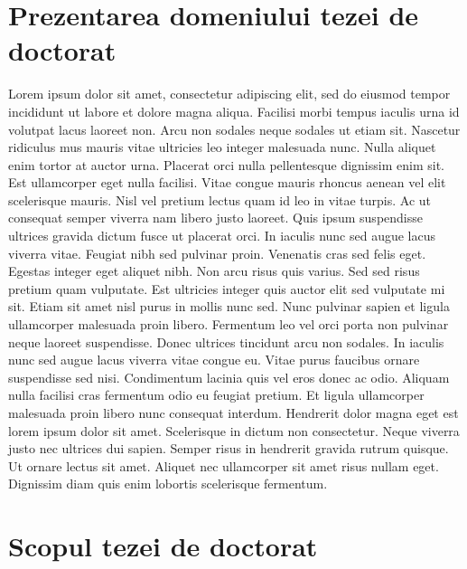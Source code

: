 \section{Prezentarea domeniului tezei de doctorat} %

Lorem ipsum dolor sit amet, consectetur adipiscing elit, sed do eiusmod tempor incididunt ut labore et dolore magna aliqua. Facilisi morbi tempus iaculis urna id volutpat lacus laoreet non. Arcu non sodales neque sodales ut etiam sit. Nascetur ridiculus mus mauris vitae ultricies leo integer malesuada nunc. Nulla aliquet enim tortor at auctor urna. Placerat orci nulla pellentesque dignissim enim sit. Est ullamcorper eget nulla facilisi. Vitae congue mauris rhoncus aenean vel elit scelerisque mauris. Nisl vel pretium lectus quam id leo in vitae turpis. Ac ut consequat semper viverra nam libero justo laoreet. Quis ipsum suspendisse ultrices gravida dictum fusce ut placerat orci. In iaculis nunc sed augue lacus viverra vitae. Feugiat nibh sed pulvinar proin. Venenatis cras sed felis eget. Egestas integer eget aliquet nibh. Non arcu risus quis varius. Sed sed risus pretium quam vulputate.
Est ultricies integer quis auctor elit sed vulputate mi sit. Etiam sit amet nisl purus in mollis nunc sed. Nunc pulvinar sapien et ligula ullamcorper malesuada proin libero. Fermentum leo vel orci porta non pulvinar neque laoreet suspendisse. Donec ultrices tincidunt arcu non sodales. In iaculis nunc sed augue lacus viverra vitae congue eu. Vitae purus faucibus ornare suspendisse sed nisi. Condimentum lacinia quis vel eros donec ac odio. Aliquam nulla facilisi cras fermentum odio eu feugiat pretium. Et ligula ullamcorper malesuada proin libero nunc consequat interdum. Hendrerit dolor magna eget est lorem ipsum dolor sit amet. Scelerisque in dictum non consectetur. Neque viverra justo nec ultrices dui sapien. Semper risus in hendrerit gravida rutrum quisque. Ut ornare lectus sit amet. Aliquet nec ullamcorper sit amet risus nullam eget. Dignissim diam quis enim lobortis scelerisque fermentum.

\section{Scopul tezei de doctorat} %


